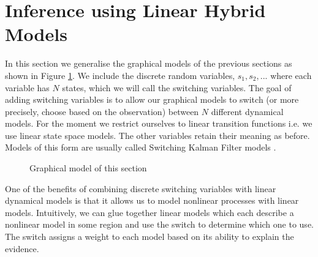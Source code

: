 \section{Inference using Linear Hybrid Models}
In this section we generalise the graphical models of the previous sections as shown in Figure \ref{fig_hybridmod1}. We include the discrete random variables, $s_1, s_2,...$ where each variable has $N$ states, which we will call the switching variables. The goal of adding switching variables is to allow our graphical models to switch (or more precisely, choose based on the observation) between $N$ different dynamical models. For the moment we restrict ourselves to linear transition functions i.e. we use linear state space models. The other variables retain their meaning as before. Models of this form are usually called Switching Kalman Filter models \cite{murphy1}. 
\begin{figure}[H] 
\centering
{}
\caption{Graphical model of this section}
\label{fig_hybridmod1}
\end{figure}
One of the benefits of combining discrete switching variables with linear dynamical models is that it allows us to model nonlinear processes with linear models. Intuitively, we can glue together linear models which each describe a nonlinear model in some region and use the switch to determine which one to use. The switch assigns a weight to each model based on its ability to explain the evidence. 

